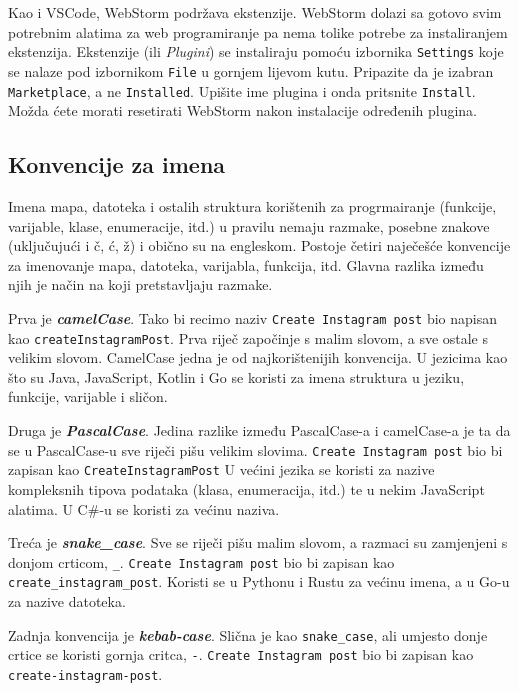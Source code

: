 Kao i VSCode, WebStorm podržava ekstenzije.
WebStorm dolazi sa gotovo svim potrebnim alatima za web programiranje pa nema tolike potrebe za instaliranjem ekstenzija.
Ekstenzije (ili \textit{Plugini}) se instaliraju pomoću izbornika \verb|Settings| koje se nalaze pod izbornikom \verb|File| u gornjem lijevom kutu.
Pripazite da je izabran \verb|Marketplace|, a ne \verb|Installed|.
Upišite ime plugina i onda pritsnite \verb|Install|.
Možda ćete morati resetirati WebStorm nakon instalacije određenih plugina.

\subsection{Konvencije za imena}\label{subsec:konvencije-za-imenovanje-struktura}

Imena mapa, datoteka i ostalih struktura korištenih za progrmairanje (funkcije, varijable, klase, enumeracije, itd.) u pravilu nemaju razmake, posebne znakove (uključujući i č, ć, ž) i obično su na engleskom.
Postoje četiri naječešće konvencije za imenovanje mapa, datoteka, varijabla, funkcija, itd.
Glavna razlika između njih je način na koji pretstavljaju razmake.

Prva je \textit{\textbf{camelCase}}.
Tako bi recimo naziv \verb|Create Instagram post| bio napisan kao \verb|createInstagramPost|.
Prva riječ započinje s malim slovom, a sve ostale s velikim slovom.
CamelCase jedna je od najkorištenijih konvencija.
U jezicima kao što su Java, JavaScript, Kotlin i Go se koristi za imena struktura u jeziku, funkcije, varijable i sličon.

Druga je \textit{\textbf{PascalCase}}.
Jedina razlike između PascalCase-a i camelCase-a je ta da se u PascalCase-u sve riječi pišu velikim slovima.
\verb|Create Instagram post| bio bi zapisan kao \verb|CreateInstagramPost|
U većini jezika se koristi za nazive kompleksnih tipova podataka (klasa, enumeracija, itd.) te u nekim JavaScript alatima.
U C\#-u se koristi za većinu naziva.

Treća je \textit{\textbf{snake\_case}}.
Sve se riječi pišu malim slovom, a razmaci su zamjenjeni s donjom crticom, \verb|_|.
\verb|Create Instagram post| bio bi zapisan kao \verb|create_instagram_post|.
Koristi se u Pythonu i Rustu za većinu imena, a u Go-u za nazive datoteka.

Zadnja konvencija je \textit{\textbf{kebab-case}}.
Slična je kao \verb|snake_case|, ali umjesto donje crtice se koristi gornja critca, \verb|-|.
\verb|Create Instagram post| bio bi zapisan kao \verb|create-instagram-post|.

